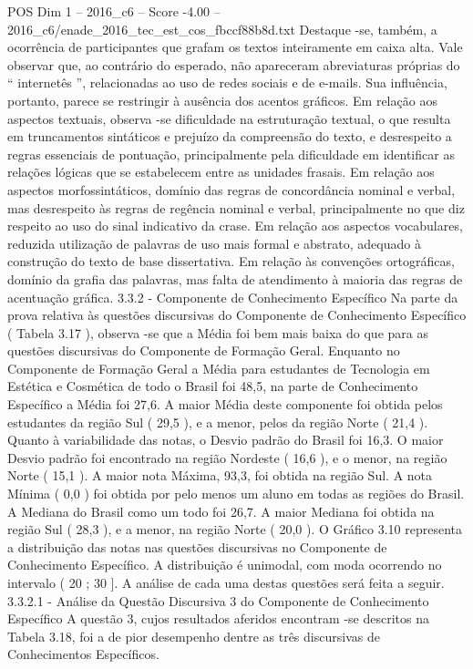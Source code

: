\begin{textsample}{POS Dim 1 – 2016\_c6 – Score -4.00 – 2016\_c6/enade\_2016\_tec\_est\_cos\_fbccf88b8d.txt}
Destaque -se, também, a ocorrência de participantes que grafam os textos inteiramente em caixa alta.
Vale observar que, ao contrário do esperado, não apareceram abreviaturas próprias do “ internetês ”, relacionadas ao uso de redes sociais e de e-mails.
Sua influência, portanto, parece se restringir à ausência dos acentos gráficos.
Em relação aos aspectos textuais, observa -se dificuldade na estruturação textual, o que resulta em truncamentos sintáticos e prejuízo da compreensão do texto, e desrespeito a regras essenciais de pontuação, principalmente pela dificuldade em identificar as relações lógicas que se estabelecem entre as unidades frasais.
Em relação aos aspectos morfossintáticos, domínio das regras de concordância nominal e verbal, mas desrespeito às regras de regência nominal e verbal, principalmente no que diz respeito ao uso do sinal indicativo da crase.
Em relação aos aspectos vocabulares, reduzida utilização de palavras de uso mais formal e abstrato, adequado à construção do texto de base dissertativa.
Em relação às convenções ortográficas, domínio da grafia das palavras, mas falta de atendimento à maioria das regras de acentuação gráfica. 3.3.2 - Componente de Conhecimento Específico Na parte da prova relativa às questões discursivas do Componente de Conhecimento Específico ( Tabela 3.17 ), observa -se que a Média foi bem mais baixa do que para as questões discursivas do Componente de Formação Geral.
Enquanto no Componente de Formação Geral a Média para estudantes de Tecnologia em Estética e Cosmética de todo o Brasil foi 48,5, na parte de Conhecimento Específico a Média foi 27,6.
A maior Média deste componente foi obtida pelos estudantes da região Sul ( 29,5 ), e a menor, pelos da região Norte ( 21,4 ).
Quanto à variabilidade das notas, o Desvio padrão do Brasil foi 16,3.
O maior Desvio padrão foi encontrado na região Nordeste ( 16,6 ), e o menor, na região Norte ( 15,1 ).
A maior nota Máxima, 93,3, foi obtida na região Sul.
A nota Mínima ( 0,0 ) foi obtida por pelo menos um aluno em todas as regiões do Brasil.
A Mediana do Brasil como um todo foi 26,7.
A maior Mediana foi obtida na região Sul ( 28,3 ), e a menor, na região Norte ( 20,0 ).
O Gráfico 3.10 representa a distribuição das notas nas questões discursivas no Componente de Conhecimento Específico.
A distribuição é unimodal, com moda ocorrendo no intervalo ( 20 ; 30 ].
A análise de cada uma destas questões será feita a seguir. 3.3.2.1 - Análise da Questão Discursiva 3 do Componente de Conhecimento Específico A questão 3, cujos resultados aferidos encontram -se descritos na Tabela 3.18, foi a de pior desempenho dentre as três discursivas de Conhecimentos Específicos.

\end{textsample}

